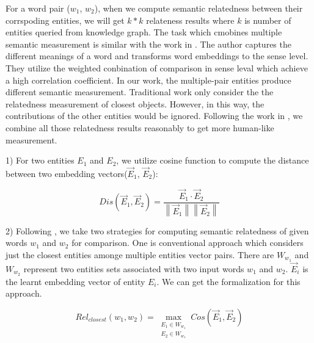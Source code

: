 For a word pair ($w_1$, $w_2$), when we compute semantic relatedness between their corrspoding entities, we
will get $k*k$ relateness results where $k$ is number of entities queried from knowledge graph.
The task which cmobines multiple semantic measurement is similar with the work in \cite{acl/IacobacciPN15}.
The author captures the different meanings of a word and transforms word embeddings to the sense level.
They utilize the weighted conbination of comparison in sense leval which achieve a high correlation coefficient.
In our work, the multiple-pair entities produce different semantic measurement. Traditional work only consider the
the relatedness measurement of closest objects. However, in this way, the contributions of the other entities would be ignored.
Following the work in \cite{acl/IacobacciPN15}, we combine all those relatedness
results reasonably to get more human-like measurement.

1) For two entities $E_1$ and $E_2$, we utilize cosine function to compute the
distance between two embedding vectors($\overrightarrow E_1$, $\overrightarrow E_2$):

\begin{small}
    \begin{equation}
        \label{cos}
        \nonumber
        Dis(\overrightarrow E_1,\overrightarrow E_2) = \frac{\overrightarrow E_1 \cdot 
        \overrightarrow E_2}{\left \| \overrightarrow E_1 \right \|\left \| \overrightarrow E_2 \right \|}
    \end{equation}
\end{small}

2) Following \cite{acl/IacobacciPN15}, we take two strategies for computing semantic relatedness of given
words $w_1$ and $w_2$ for comparison. One is conventional approach \cite{BudanitskyH06} which considers just the closest entities
amonge multiple entities vector pairs. There are $W_{w_1}$ and $W_{w_2}$ represent two entities sets associated with two
input words $w_1$ and $w_2$. $\overrightarrow E_i$ is the learnt embedding vector of entity $E_i$. We can get the
formalization for this approach.

\begin{small}
    \begin{equation}
        \label{cos}
        \nonumber
        Rel_{closest}(w_1, w_2) = \max \limits_{\substack{E_1 \in W_{w_1} \\ E_2 \in W_{w_1}}}
        Cos(\overrightarrow E_1,\overrightarrow E_2)
    \end{equation}
\end{small}

